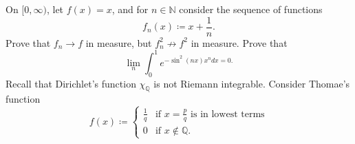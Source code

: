 \documentclass{exam}
\begin{document}
\begin{questions}
    \question[6]
        On $[0,\infty)$, let $f(x) = x$, and for $n\in\mathbb{N}$ consider the sequence of functions
        \[f_n(x) \coloneq x+\frac{1}{n}.\]
        Prove that $f_n \to f$ in measure, but $f_n^2 \not\to f^2$ in measure.
    \question[6]
        Prove that
        \[\lim_n \int_0^1 e^{-\sin^2(nx)x^ndx=0.}\]
    \question[8]
        Recall that Dirichlet's function $\chi_\mathbb{Q}$ is not Riemann integrable. Consider Thomae's function 
        \begin{equation*}
            f(x) \coloneq 
            \begin{cases}
                \frac{1}{q} & \text{if } x=\frac{p}{q} \text{ is in lowest terms}\\
                0 & \text{if } x\not\in\mathbb{Q}.
            \end{cases}
        \end{equation*}
\end{questions}
\end{document}

